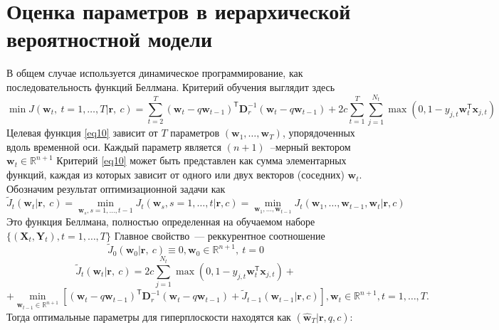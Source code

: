 \documentclass[12pt, twoside]{article}
\newenvironment{comment}{}{}
\begin{document}
\begin{comment}
\section{Оценка параметров в иерархической вероятностной модели}
В общем случае используется динамическое программирование, как последовательность функций Беллмана. Критерий обучения выглядит здесь
\begin{equation}\label{eq10}
\min J(\textbf{w}_t,\ t=1,\ldots,T|\textbf{r},\ c) = \sum_{t=2}^T(\textbf{w}_t - q\textbf{w}_{t-1})^{\mathsf{T}}\textbf{D}^{-1}_r(\textbf{w}_t - q\textbf{w}_{t-1}) + 2c\sum_{t=1}^T\sum_{j=1}^{N_t}\max(0,1 - y_{j,t}\textbf{w}^{\mathsf{T}}_t\textbf{x}_{j,t})
\end{equation}
Целевая функция \eqref{eq10} зависит от $T$ параметров $(\textbf{w}_1, \ldots, \textbf{w}_T)$, упорядоченных вдоль временной оси. Каждый параметр является $(n+1)$~--мерный вектором $\textbf{w}_t \in \mathbb{R}^{n+1}$ Критерий \eqref{eq10} может быть представлен как сумма элементарных функций, каждая из которых зависит от одного или двух векторов (соседних) $\textbf{w}_t$. Обозначим результат оптимизационной задачи как \begin{equation}
\widetilde{J}_t(\textbf{w}_t|\textbf{r},\ c) = \underset{\textbf{w}_s, s= 1, \ldots, t - 1}\min J_t(\textbf{w}_s, s = 1, \ldots, t|\textbf{r},c) = \underset{\textbf{w}_1,\ldots, \textbf{w}_{t-1}}\min J_t(\textbf{w}_1,\ldots,\textbf{w}_{t-1}, \textbf{w}_t|\textbf{r},c)
\end{equation}
Это функция Беллмана, полностью определенная на обучаемом наборе $\{(\textbf{X}_t,\textbf{Y}_t), t = 1,\ldots,T\}$ Главное свойство~--- реккурентное соотношение
\begin{equation}
\widetilde{J}_0(\textbf{w}_0|\textbf{r},\ c) \equiv 0, \textbf{w}_0 \in \mathbb{R}^{n+1},\ t = 0
\end{equation}
\begin{equation}
\widetilde{J}_t(\textbf{w}_t|\textbf{r},\ c) = 2c\sum_{j = 1}^{N_t}\max(0,1 - y_{j,t}\textbf{w}^{\mathsf{T}}_t\textbf{x}_{j,t}) + 
\end{equation}
\begin{equation}
+ \underset{\textbf{w}_{t-1} \in \mathbb{R}^{n+1}}\min\left[(\textbf{w}_t - q\textbf{w}_{t-1})^{\mathsf{T}}\textbf{D}^{-1}_r(\textbf{w}_t - q\textbf{w}_{t-1}) + \widetilde{J}_{t-1}(\textbf{w}_{t-1}|\textbf{r},c)\right], \textbf{w}_t \in \mathbb{R}^{n+1}, t = 1,\ldots, T.
\end{equation}
Тогда оптимальные параметры для гиперплоскости находятся как $(\hat{\textbf{w}}_{T}|\textbf{r}, q, c)$:

\end{comment}
\end{document}
